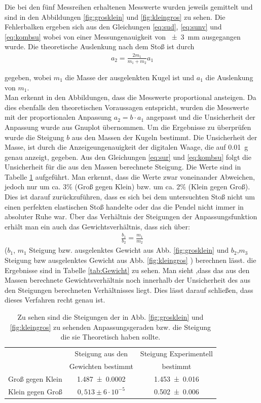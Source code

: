 Die bei den fünf Messreihen erhaltenen Messwerte wurden jeweils gemittelt und sind in den Abbildungen \ref{fig:grosklein} und \ref{fig:kleingros} zu sehen. Die Fehlerbalken ergeben sich aus den Gleichungen \ref{eq:sud}, \ref{eq:sunv} und \ref{eq:kombsu} wobei von einer Messungenauigkeit von \SI{+-3}{mm} ausgegangen wurde.
Die theoretische Auslenkung nach dem Stoß ist durch
\begin{align}
	a_2= \frac{2m_1}{m_1+m_2} a_1\label{eq:Auslenkung}
\end{align} 

gegeben, wobei $m_1$ die Masse der ausgelenkten Kugel ist und $a_1$ die Auslenkung von $m_1$.\\
Man erkennt in den Abbildungen, dass die Messwerte proportional ansteigen.
Da dies ebenfalls den theoretischen Voraussagen entspricht, wurden die Messwerte mit der proportionalen Anpassung $a_2=b \cdot a_1$ angepasst und die Unsicherheit der Anpassung wurde aus Gnuplot übernommen.
Um die Ergebnisse zu überprüfen wurde die Steigung $b$ aus den Massen der Kugeln bestimmt. Die Unsicherheit der Masse, ist durch die Anzeigeungenauigkeit der digitalen Waage, die auf \SI{0.01}{g} genau anzeigt, gegeben. Aus den Gleichungen \ref{eq:sur} und \ref{eq:kombsu} folgt die Unsicherheit für die aus den Massen berechnete Steigung. Die Werte sind in Tabelle \ref{tab:steigung} aufgeführt.
Man erkennt, dass die Werte zwar voneinander Abweichen, jedoch nur um ca. $3\%$ (Groß gegen Klein) bzw. um ca. $2\%$ (Klein gegen Groß). Dies ist darauf zurückzuführen, dass es sich bei dem untersuchten Stoß nicht um einen perfekten elastischen Stoß handelte oder das die Pendel nicht immer in absoluter Ruhe war.
Über das Verhältnis der Steigungen der Anpassungsfunktion erhält man ein auch das Gewichtsverhältnis, dass sich über: 
\begin{align}
\frac{b_1}{b_2}=\frac{m_1}{m_2}	
\end{align} 
($b_1$, $m_1$ Steigung bzw. ausgelenktes Gewicht aus Abb. \ref{fig:grosklein} und $b_2$,$m_3$ Steigung bzw ausgelenktes Gewicht aus Abb. \ref{fig:kleingros} ) berechnen lässt. die Ergebnisse sind in Tabelle \ref{tab:Gewicht} zu sehen.
Man sieht ,dass das aus den Massen berechnete Gewichtsverhältnis  noch innerhalb der Unsicherheit des aus den Steigungen berechneten Verhältnisses liegt. Dies lässt darauf schließen, dass dieses Verfahren recht genau ist.

\begin{table}[h]
	\caption{Zu sehen sind die Steigungen der in Abb. \ref{fig:grosklein} und \ref{fig:kleingros} zu sehenden Anpassungsgeraden bzw. die Steigung die sie Theoretisch haben sollte.}
	\begin{tabular}{|c|c|c|}
		\hline
		& Steigung aus den & Steigung Experimentell\\
		& Gewichten bestimmt & bestimmt\\
		\hline
		Groß gegen Klein &  \SI{1,487+-0,0002}{} & \SI{1,453+-0,016}{} \\
		\hline
		Klein gegen Groß & $0,513 \pm 6 \cdot 10^{-5}$&\SI{0,502+-0,006}{}\\
		\hline
	\end{tabular}
\label{tab:steigung}
\end{table}

